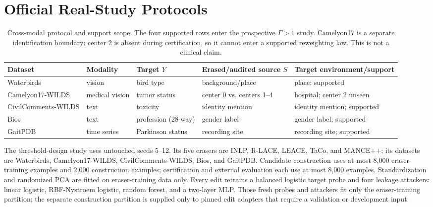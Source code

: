 \section{Official Real-Study Protocols}

\begin{table}[t]
\centering
\scriptsize
\begin{tabular}{@{}lllll@{}}
\toprule
Dataset & Modality & Target $Y$ & Erased/audited source $S$ & Target environment/support \\
\midrule
Waterbirds & vision & bird type & background/place & place; supported \\
Camelyon17-WILDS & medical vision & tumor status & center 0 vs. centers 1--4 & hospital; center 2 unseen \\
CivilComments-WILDS & text & toxicity & identity mention & identity mention; supported \\
Bios & text & profession (28-way) & gender label & gender label; supported \\
GaitPDB & time series & Parkinson status & recording site & recording site; supported \\
\bottomrule
\end{tabular}
\caption{Cross-modal protocol and support scope. The four supported rows enter
the prospective $\Gamma>1$ study. Camelyon17 is a separate identification
boundary: center 2 is absent during certification, so it cannot enter a
supported reweighting law. This is not a clinical claim.}
\label{tab:datasets}
\end{table}

The threshold-design study uses untouched seeds 5--12. Its five erasers are INLP,
R-LACE, LEACE, TaCo, and MANCE++; its datasets are Waterbirds,
Camelyon17-WILDS, CivilComments-WILDS, Bios, and GaitPDB. Candidate construction
uses at most 8,000 eraser-training examples and 2,000 construction examples;
certification and external evaluation each use at most 8,000 examples.
Standardization and randomized PCA are fitted on eraser-training data only.
Every edit retrains a balanced logistic target probe and four leakage attackers:
linear logistic, RBF-Nystroem logistic, random forest, and a two-layer MLP.
Those fresh probes and attackers fit only the eraser-training partition; the
separate construction partition is supplied only to pinned edit adapters that
require a validation or development input.

